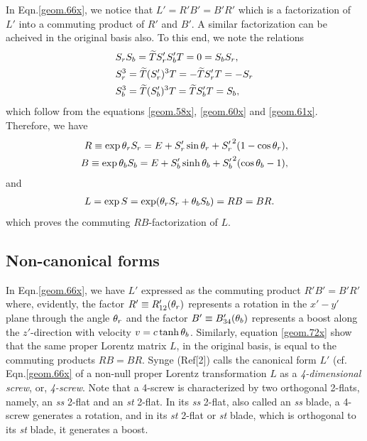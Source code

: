  In 
Eqn.\eqref{geom.66x}, we notice that $L'=R'B'=B'R'$ 
which is a factorization of  $L'$ into a commuting 
product of $R'$ and $B'$. A similar factorization can 
be acheived in the original basis also. To this end, 
we 
note the relations
\begin{align}\label{geom.69x}
&S_rS_b=\tilde{T}S'_r S'_b T=0=S_bS_r,\notag\\
&S^3_r =\tilde{T}(S'_r )^3 T=-\tilde{T}S'_r 
T=-S_r\notag\\
&S^3_b =\tilde{T}(S'_b )^3 T=\tilde{T}S'_b T=S_b,
\end{align}
which follow from the equations \eqref{geom.58x},
\eqref{geom.60x} and \eqref{geom.61x}.
Therefore, we have
\begin{align}\label{geom.70x}
R\equiv \exp{\gkq_r S_r}=
E+{S'_r}\sin\gkq_r +{S'_r}^2(1-\cos\gkq_r),\\
B\equiv \exp{\gkq_b S_b}
=E+{S'_b}\sinh\gkq_b+{S'_b}^2(\cos\gkq_b-1),
\end{align}
and
\begin{align}\label{geom.72x}
L&=\exp{S}=\exp(\gkq_r S_r+\gkq_b S_b)=RB=BR.
\end{align}
which proves the commuting $RB$-factorization of 
$L$. 

\subsection{Non-canonical forms}

In Eqn.\eqref{geom.66x}, we have $L'$ expressed as  
the 
commuting product $R'B'=B'R'$ where, evidently, the 
factor $R'\equiv R'_{12}(\gkq_r)$ represents a 
rotation 
in the $x'-y'$ plane through the angle $\gkq_r$ and 
the 
 factor $B'\equiv B'_{34}(\gkq_b)$ represents a boost 
along the $z'$-direction with velocity 
$v=c\tanh\gkq_b$. Similarly, equation \eqref{geom.72x} 
show that the same proper Lorentz matrix $L$, in the 
original basis, is equal to the commuting products 
$RB=BR$. Synge (Ref[2]) calls the canonical form $L'$ 
(cf. Eqn.\eqref{geom.66x} of a non-null proper Lorentz 
transformation $L$ as a \textsl{4-dimensional screw}, 
or, \textsl{4-screw}. Note that a 4-screw is 
characterized by two orthogonal 2-flats, namely, an 
\textsl{ss} 2-flat and an   \textsl{st} 2-flat. In its 
\textsl{ss} 2-flat, also called an  \textsl{ss} blade, 
a 4-screw generates a rotation, and in its \textsl{st} 
2-flat or  \textsl{st} blade, which is orthogonal to 
its  \textsl{st} blade, it generates a boost. 

